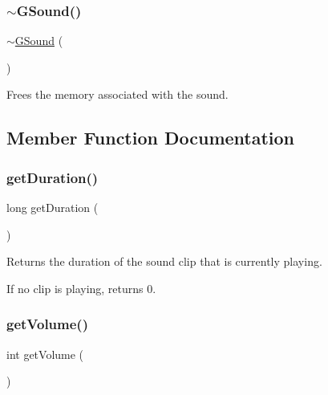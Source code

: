 \subsubsection{\texorpdfstring{$\sim$\+G\+Sound()}{~GSound()}}
{\footnotesize\ttfamily $\sim$\mbox{\hyperlink{classsgl_1_1GSound}{G\+Sound}} (\begin{DoxyParamCaption}{ }\end{DoxyParamCaption})\hspace{0.3cm}{\ttfamily [virtual]}}



Frees the memory associated with the sound. 



\subsection{Member Function Documentation}
\mbox{\label{classsgl_1_1GSound_affcaa1708a828c64648b58bd21223235}} 
\subsubsection{\texorpdfstring{get\+Duration()}{getDuration()}}
{\footnotesize\ttfamily long get\+Duration (\begin{DoxyParamCaption}{ }\end{DoxyParamCaption})\hspace{0.3cm}{\ttfamily [static]}}



Returns the duration of the sound clip that is currently playing. 

If no clip is playing, returns 0. \mbox{\label{classsgl_1_1GSound_aac9746ddc550ec176b0957affafbdbe7}} 
\subsubsection{\texorpdfstring{get\+Volume()}{getVolume()}}
{\footnotesize\ttfamily int get\+Volume (\begin{DoxyParamCaption}{ }\end{DoxyParamCaption})\hspace{0.3cm}{\ttfamily [static]}}



